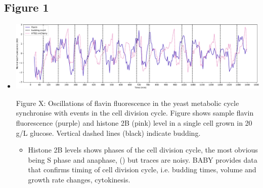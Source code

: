 \subsection{Figure 1}
\label{sec:org6662011}
\begin{itemize}
\item \begin{center}
\includegraphics[width=.9\linewidth]{single_birth_plot_edit.pdf}
\end{center} Figure X: Oscillations of flavin fluorescence in the yeast metabolic cycle synchronise with events in the cell division cycle.  Figure shows sample flavin fluorescence (purple) and histone 2B (pink) level in a single cell grown in 20 g/L glucose.  Vertical dashed lines (black) indicate budding.

\begin{itemize}
\item Histone 2B levels shows phases of the cell division cycle, the most obvious being S phase and anaphase, (\cite{garmendia-torresMultipleInputsEnsure2018}) but traces are noisy.  BABY provides data that confirms timing of cell division cycle, i.e. budding times, volume and growth rate changes, cytokinesis.
\end{itemize}
\end{itemize}

